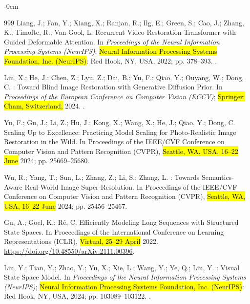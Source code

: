 \documentclass[symmetry,article,accept,pdftex,moreauthors]{Definitions/mdpi}
\begin{document}
\begin{adjustwidth}{-\extralength}{0cm}
\begin{thebibliography}{999}
Liang, J.; Fan, Y.; Xiang, X.; Ranjan, R.; Ilg, E.; Green, S.; Cao, J.; Zhang,
  K.; Timofte, R.; {Van Gool}, L.
\newblock Recurrent Video Restoration Transformer with Guided Deformable
  Attention.
\newblock In \emph{Proceedings of the Neural Information Processing Systems
  (NeurIPS)}; \hl{Neural Information Processing Systems Foundation, Inc. (NeurIPS)}: Red Hook, NY, USA,  2022; pp. 378--393.
 .

Lin, X.; He, J.; Chen, Z.; Lyu, Z.; Dai, B.; Yu, F.; Qiao, Y.; Ouyang, W.;
  Dong, C.
: Toward Blind Image Restoration with Generative Diffusion
  Prior.
\newblock In \emph{Proceedings of the European Conference on Computer Vision (ECCV)}; \hl{Springer: Cham, Switzerland,}
  2024.
.

Yu, F.; Gu, J.; Li, Z.; Hu, J.; Kong, X.; Wang, X.; He, J.; Qiao, Y.; Dong, C.
\newblock Scaling Up to Excellence: Practicing Model Scaling for
  Photo-Realistic Image Restoration in the Wild.
\newblock In Proceedings of the IEEE/CVF Conference on
  Computer Vision and Pattern Recognition (CVPR),  \hl{Seattle, WA, USA, 16--22 June} 2024; pp. 25669--25680.

Wu, R.; Yang, T.; Sun, L.; Zhang, Z.; Li, S.; Zhang, L.
: Towards Semantics-Aware Real-World Image Super-Resolution.
\newblock In Proceedings of the IEEE/CVF Conference on
  Computer Vision and Pattern Recognition (CVPR), \hl{Seattle, WA, USA, 16--22 June} 2024; pp. 25456--25467.

Gu, A.; Goel, K.; R{\'e}, C.
\newblock Efficiently Modeling Long Sequences with Structured State Spaces.
\newblock In Proceedings of the International Conference on Learning
  Representations (ICLR), \hl{Virtual,  25--29 April} 2022.
  \url{ 	
https://doi.org/10.48550/arXiv.2111.00396}.

Liu, Y.; Tian, Y.; Zhao, Y.; Yu, X.; Xie, L.; Wang, Y.; Ye, Q.; Liu, Y.
: Visual State Space Model.
\newblock In \emph{Proceedings of the Neural Information Processing Systems
  (NeurIPS)}; \hl{Neural Information Processing Systems Foundation, Inc. (NeurIPS)}: Red Hook, NY, USA,  2024; pp. 103089--103122.
 .


\end{thebibliography}
\end{adjustwidth}
\end{document}
